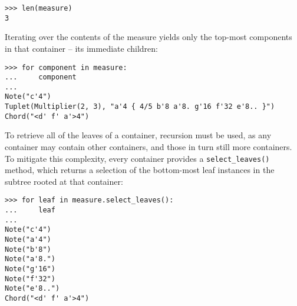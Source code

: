 \begin{comment}
<abjad>
len(measure)
</abjad>
\end{comment}

\begin{abjadbookoutput}
\begin{singlespacing}
\vspace{-0.5\baselineskip}
\begin{lstlisting}
>>> len(measure)
3
\end{lstlisting}
\end{singlespacing}
\end{abjadbookoutput}

\noindent Iterating over the contents of the  measure yields only
the top-most components in that container -- its immediate children:

\begin{comment}
<abjad>
for component in measure:
    component

</abjad>
\end{comment}

\begin{abjadbookoutput}
\begin{singlespacing}
\vspace{-0.5\baselineskip}
\begin{lstlisting}
>>> for component in measure:
...     component
...
Note("c'4")
Tuplet(Multiplier(2, 3), "a'4 { 4/5 b'8 a'8. g'16 f'32 e'8.. }")
Chord("<d' f' a'>4")
\end{lstlisting}
\end{singlespacing}
\end{abjadbookoutput}

\noindent To retrieve all of the leaves of a container, recursion must be used,
as any container may contain other containers, and those in turn still more
containers. To mitigate this complexity, every container provides a
\texttt{select\_leaves()} method, which returns a selection of the bottom-most
leaf instances in the subtree rooted at that container:

\begin{comment}
<abjad>
for leaf in measure.select_leaves():
    leaf

</abjad>
\end{comment}

\begin{abjadbookoutput}
\begin{singlespacing}
\vspace{-0.5\baselineskip}
\begin{lstlisting}
>>> for leaf in measure.select_leaves():
...     leaf
...
Note("c'4")
Note("a'4")
Note("b'8")
Note("a'8.")
Note("g'16")
Note("f'32")
Note("e'8..")
Chord("<d' f' a'>4")
\end{lstlisting}
\end{singlespacing}
\end{abjadbookoutput}

